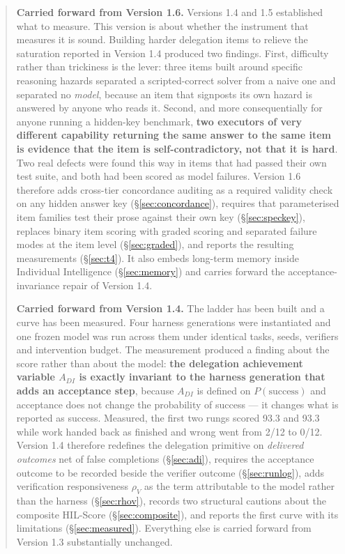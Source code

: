 \documentclass[11pt]{article}
\theoremstyle{definition}
\newcommand{\rhov}{\ensuremath{\rho_V}}
\begin{document}
\begin{abstract}
\medskip
\noindent\textbf{Carried forward from Version 1.6.} Versions 1.4 and 1.5 established what to measure. This version is about whether the instrument that measures it is sound. Building harder delegation items to relieve the saturation reported in Version 1.4 produced two findings. First, difficulty rather than trickiness is the lever: three items built around specific reasoning hazards separated a scripted-correct solver from a naive one and separated no \emph{model}, because an item that signposts its own hazard is answered by anyone who reads it. Second, and more consequentially for anyone running a hidden-key benchmark, \textbf{two executors of very different capability returning the same answer to the same item is evidence that the item is self-contradictory, not that it is hard}. Two real defects were found this way in items that had passed their own test suite, and both had been scored as model failures. Version 1.6 therefore adds cross-tier concordance auditing as a required validity check on any hidden answer key (\S\ref{sec:concordance}), requires that parameterised item families test their prose against their own key (\S\ref{sec:speckey}), replaces binary item scoring with graded scoring and separated failure modes at the item level (\S\ref{sec:graded}), and reports the resulting measurements (\S\ref{sec:t4}). It also embeds long-term memory inside Individual Intelligence (\S\ref{sec:memory}) and carries forward the acceptance-invariance repair of Version 1.4.

\medskip
\noindent\textbf{Carried forward from Version 1.4.} The ladder has been built and a curve has been measured. Four harness generations were instantiated and one frozen model was run across them under identical tasks, seeds, verifiers and intervention budget. The measurement produced a finding about the score rather than about the model: \textbf{the delegation achievement variable $A_{DI}$ is exactly invariant to the harness generation that adds an acceptance step}, because $A_{DI}$ is defined on $P(\text{success})$ and acceptance does not change the probability of success --- it changes what is reported as success. Measured, the first two rungs scored 93.3 and 93.3 while work handed back as finished and wrong went from 2/12 to 0/12. Version 1.4 therefore redefines the delegation primitive on \emph{delivered outcomes} net of false completions (\S\ref{sec:adi}), requires the acceptance outcome to be recorded beside the verifier outcome (\S\ref{sec:runlog}), adds verification responsiveness \rhov{} as the term attributable to the model rather than the harness (\S\ref{sec:rhov}), records two structural cautions about the composite HIL-Score (\S\ref{sec:composite}), and reports the first curve with its limitations (\S\ref{sec:measured}). Everything else is carried forward from Version 1.3 substantially unchanged.


\end{abstract}
\end{document}
